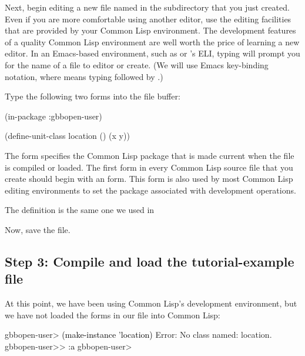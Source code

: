 \documentclass[10pt,twoside,english,pdftex]{article}
\begin{document}
Next, begin editing a new file named  in
the  subdirectory that you just created.  Even if you are more
comfortable using another editor, use the editing facilities that are provided
by your Common Lisp environment.  The development features of a quality Common
Lisp environment are well worth the price of learning a new editor.  In an
Emacs-based environment, such as
 or 's ELI, typing  will prompt
you for the name of a file to editor or create.  (We will use Emacs
key-binding notation, where  means typing 
followed by {}.)

Type the following two forms into the  file
buffer:
%
\W\supp
\begin{example}
  (in-package :gbbopen-user)

  (define-unit-class location ()
    (x y))
\end{example}

The  form specifies the Common Lisp package that is
made current when the file is compiled or loaded.  The first form in every
Common Lisp source file that you create should begin with an
 form.  This form is also used by most Common Lisp
editing environments to set the package associated with development
operations.

The  definition is the same one we used in

Now, save the file.  

\subsection*{Step 3: Compile and load the tutorial-example file}

At this point, we have been using Common Lisp's
development environment, but we have not loaded the forms in our file
into Common Lisp:
%
\W\supp
\begin{example}
\textcolor{darkergray}{%
  gbbopen-user> \textcolor{black}{(make-instance 'location)}
  Error: No class named: location.
  gbbopen-user>> \textcolor{black}{:a}
  gbbopen-user>}
\end{example}
\end{document}
